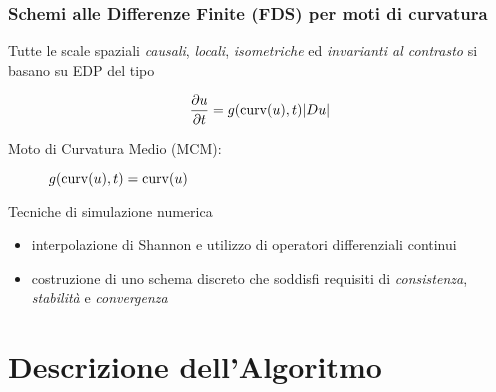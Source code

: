 \documentclass{beamer}
\begin{document}
\begin{frame}
  \frametitle{Schemi alle Differenze Finite (FDS) per moti di curvatura}

  Tutte le scale spaziali \emph{causali}, \emph{locali}, \emph{isometriche} ed \emph{invarianti al contrasto} si basano su EDP del tipo

$$
\frac{\partial u}{\partial t}=g({\rm curv}(u),t)|Du|
$$

\vspace{0.5em}

  \begin{description} 
    \item[Moto di Curvatura Medio (MCM):] $g({\rm curv}(u),t)={\rm curv}(u)$
  \end{description}

  \begin{block}{Tecniche di simulazione numerica}

    \begin{itemize}
      \item interpolazione di Shannon e utilizzo di operatori differenziali continui
      \item costruzione di uno schema discreto che soddisfi requisiti di \emph{consistenza}, \emph{stabilit\`a} e \emph{convergenza}
    \end{itemize}
  \end{block}

\end{frame}



\section{Descrizione dell'Algoritmo}
\end{document}
